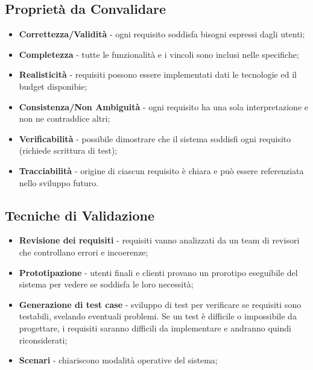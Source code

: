 \documentclass{article}
\begin{document}
    \subsection{Proprietà da Convalidare}
      \begin{itemize}
        \item \textbf{Correttezza/Validità} - ogni requisito soddisfa bisogni espressi dagli utenti;
        \item \textbf{Completezza} - tutte le funzionalità e i vincoli sono inclusi nelle specifiche;
        \item \textbf{Realisticità} - requisiti possono essere implementati dati le tecnologie ed il budget disponibie;
        \item \textbf{Consistenza/Non Ambiguità} - ogni requisito ha una sola interpretazione e non ne contraddice altri;
        \item \textbf{Verificabilità} - possibile dimostrare che il sistema soddisfi ogni requisito (richiede scrittura di test);
        \item \textbf{Tracciabilità} - origine di ciascun requisito è chiara e può essere referenziata nello sviluppo futuro. 
      \end{itemize}
    \subsection{Tecniche di Validazione}
      \begin{itemize}
        \item \textbf{Revisione dei requisiti} - requisiti vanno analizzati da un team di revisori che controllano errori e incoerenze;
        \item \textbf{Prototipazione} - utenti finali e clienti provano un prorotipo eseguibile del sistema per vedere se soddisfa le loro necessità;
        \item \textbf{Generazione di test case} - sviluppo di test per verificare se requisiti sono testabili, svelando eventuali problemi. Se un test è difficile o impossibile da progettare, i requisiti saranno difficili da implementare e andranno quindi riconsiderati;
        \item \textbf{Scenari} - chiariscono modalità operative del sistema;
      \end{itemize}
\end{document}
